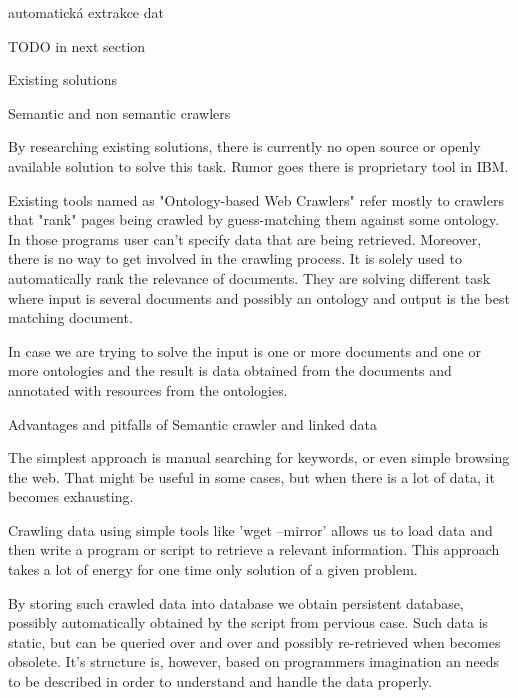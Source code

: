 \sec automatická extrakce dat

TODO in next section














\chap Existing solutions


\sec Semantic and non semantic crawlers

By researching existing solutions, there is currently no open source or openly
available solution to solve this task. Rumor goes there is proprietary tool in IBM.

Existing tools named as "Ontology-based Web Crawlers" refer mostly to crawlers
that "rank" pages being crawled by guess-matching them against some ontology.
In those programs user can't specify data that are being retrieved. Moreover,
there is no way to get involved in the crawling process. It is solely used to
automatically rank the relevance of documents. They are solving different task
where input is several documents and possibly an ontology and output is the
best matching document. 

In case we are trying to solve the input is one or more documents and one or
more ontologies and the result is data obtained from the documents and
annotated with resources from the ontologies. 

\sec Advantages and pitfalls of Semantic crawler and linked data

The simplest approach is manual searching for keywords, or even simple browsing
the web. That might be useful in some cases, but when there is a lot of data,
it becomes exhausting. 

Crawling data using simple tools like 'wget --mirror' allows us to load data
and then write a program or script to retrieve a relevant information. This
approach takes a lot of energy for one time only solution of a given problem. 

By storing such crawled data into database we obtain persistent database,
possibly automatically obtained by the script from pervious case. Such data is
static, but can be queried over and over and possibly re-retrieved when becomes
obsolete. It's structure is, however, based on programmers imagination an
needs to be described in order to understand and handle the data properly. 

